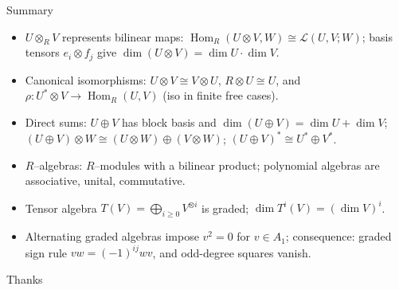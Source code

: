 \begin{frame}{Summary}
\begin{itemize}
\item $U\otimes_R V$ represents bilinear maps: $\operatorname{Hom}_R(U\otimes V,W)\cong \mathcal{L}(U,V;W)$; basis tensors $e_i\otimes f_j$ give $\dim(U\otimes V)=\dim U\cdot \dim V$.
\item Canonical isomorphisms: $U\otimes V \cong V\otimes U$, $R\otimes U \cong U$, and $\rho:U^*\otimes V\to \operatorname{Hom}_R(U,V)$ (iso in finite free cases).
\item Direct sums: $U\oplus V$ has block basis and $\dim(U\oplus V)=\dim U+\dim V$; $(U\oplus V)\otimes W \cong (U\otimes W)\oplus (V\otimes W)$; $(U\oplus V)^*\cong U^*\oplus V^*$.
\item $R$–algebras: $R$–modules with a bilinear product; polynomial algebras are associative, unital, commutative.
\item Tensor algebra $T(V)=\bigoplus_{i\ge 0} V^{\otimes i}$ is graded; $\dim T^i(V)= (\dim V)^i$.
\item Alternating graded algebras impose $v^2=0$ for $v\in A_1$; consequence: graded sign rule $vw=(-1)^{ij}wv$, and odd-degree squares vanish.
\end{itemize}
\end{frame}

\begin{frame}{Thanks}
  \cmcendframe
\end{frame}


